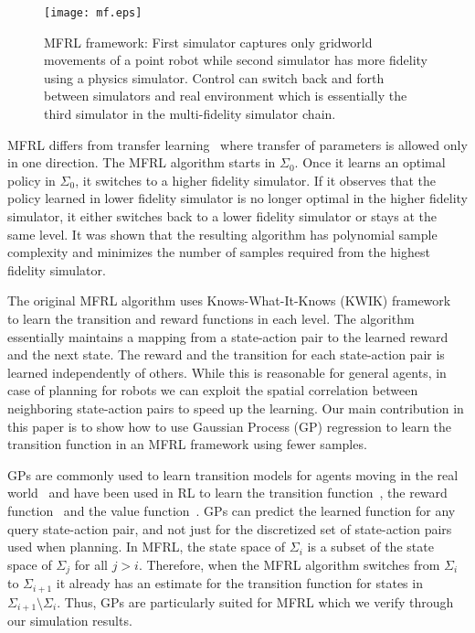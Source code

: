 \documentclass[12pt]{report}
\begin{document}
\begin{figure}[htp]
	\centering
	\texttt{[image: mf.eps]}
	\caption {MFRL framework: First simulator captures only gridworld movements of a point robot while second simulator has more fidelity using a physics simulator. Control can switch back and forth between simulators and real environment which is essentially the third simulator in the multi-fidelity simulator chain.}
   \label{fig:mfrl_architecture}
\end{figure}

MFRL differs from transfer learning~\cite{taylor2007transfer} where transfer of parameters is allowed only in one direction. The MFRL algorithm starts in $\Sigma_0$. Once it learns an optimal policy in $\Sigma_0$, it switches to a higher fidelity simulator. If it observes that the policy learned in lower fidelity simulator is no longer optimal in the higher fidelity simulator, it either switches back to a lower fidelity simulator or stays at the same level. It was shown that the resulting algorithm has polynomial sample complexity and minimizes the number of samples required from the highest fidelity simulator. 

The original MFRL algorithm uses Knows-What-It-Knows (KWIK) framework~\cite{li2011knows} to learn the transition and reward functions in each level. The algorithm essentially maintains a mapping from a state-action pair to the learned reward and the next state. The reward and the transition for each state-action pair is learned independently of others. While this is reasonable for general agents, in case of planning for robots we can exploit the spatial correlation between neighboring state-action pairs to speed up the learning. Our main contribution in this paper is to show how to use Gaussian Process (GP) regression to learn the transition function in an MFRL framework using fewer samples. 

GPs are commonly used to learn transition models for agents moving in the real world~\cite{Dames2015} and have been used in RL to learn the transition function~\cite{rasmussen2003gaussian}, the reward function~\cite{deisenroth2010efficient} and the value function~\cite{engel2005reinforcement}. GPs can predict the learned function for any query state-action pair, and not just for the discretized set of state-action pairs used when planning. In MFRL, the state space of $\Sigma_i$ is a subset of the state space of $\Sigma_j$ for all $j>i$. Therefore, when the MFRL algorithm switches from $\Sigma_i$ to $\Sigma_{i+1}$ it already has an estimate for the transition function for states in $\Sigma_{i+1}\setminus\Sigma_{i}$. Thus, GPs are particularly suited for MFRL which we verify through our simulation results.
\end{document}
